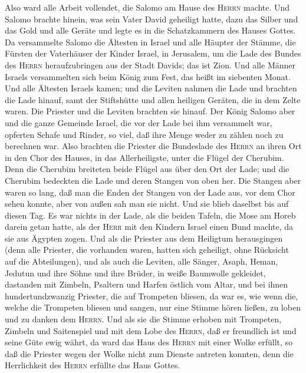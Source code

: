  Also ward alle Arbeit vollendet, die Salomo am Hause des
\textsc{Herrn} machte. Und Salomo brachte hinein, was sein Vater David
geheiligt hatte, dazu das Silber und das Gold und alle Geräte und legte
es in die Schatzkammern des Hauses Gottes.  Da versammelte
Salomo die Ältesten in Israel und alle Häupter der Stämme, die Fürsten
der Vaterhäuser der Kinder Israel, in Jerusalem, um die Lade des Bundes
des \textsc{Herrn} heraufzubringen aus der Stadt Davids; das ist Zion.
 Und alle Männer Israels versammelten sich beim König zum
Fest, das heißt im siebenten Monat.  Und alle Ältesten
Israels kamen; und die Leviten nahmen die Lade  und
brachten die Lade hinauf, samt der Stiftshütte und allen heiligen
Geräten, die in dem Zelte waren. Die Priester und die Leviten brachten
sie hinauf.  Der König Salomo aber und die ganze Gemeinde
Israel, die vor der Lade bei ihm versammelt war, opferten Schafe und
Rinder, so viel, daß ihre Menge weder zu zählen noch zu berechnen war.
 Also brachten die Priester die Bundeslade des
\textsc{Herrn} an ihren Ort in den Chor des Hauses, in das
Allerheiligste, unter die Flügel der Cherubim.  Denn die
Cherubim breiteten beide Flügel aus über den Ort der Lade; und die
Cherubim bedeckten die Lade und deren Stangen von oben her.
 Die Stangen aber waren so lang, daß man die Enden der
Stangen von der Lade aus, vor dem Chor sehen konnte, aber von außen sah
man sie nicht. Und sie blieb daselbst bis auf diesen Tag.
 Es war nichts in der Lade, als die beiden Tafeln, die
Mose am Horeb darein getan hatte, als der \textsc{Herr} mit den Kindern
Israel einen Bund machte, da sie aus Ägypten zogen.  Und
als die Priester aus dem Heiligtum herausgingen (denn alle Priester, die
vorhanden waren, hatten sich geheiligt, ohne Rücksicht auf die
Abteilungen),  und als auch die Leviten, alle Sänger,
Asaph, Heman, Jedutun und ihre Söhne und ihre Brüder, in weiße Baumwolle
gekleidet, dastanden mit Zimbeln, Psaltern und Harfen östlich vom Altar,
und bei ihnen hundertundzwanzig Priester, die auf Trompeten bliesen,
 da war es, wie wenn die, welche die Trompeten bliesen
und sangen, nur eine Stimme hören ließen, zu loben und zu danken dem
\textsc{Herrn}. Und als sie die Stimme erhoben mit Trompeten, Zimbeln
und Saitenspiel und mit dem Lobe des \textsc{Herrn}, daß er freundlich
ist und seine Güte ewig währt, da ward das Haus des \textsc{Herrn} mit
einer Wolke erfüllt,  so daß die Priester wegen der Wolke
nicht zum Dienste antreten konnten, denn die Herrlichkeit des
\textsc{Herrn} erfüllte das Haus Gottes.


